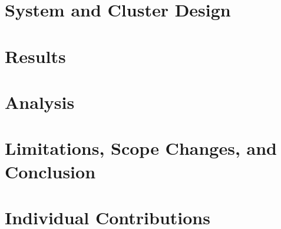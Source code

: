 \documentclass[11pt,twocolumn]{article}
\begin{document}
\section{System and Cluster Design}
\wsfourSystem
\section{Results}
\wsfourResults
\section{Analysis}
\wsfourAnalysis
\section{Limitations, Scope Changes, and Conclusion}
\wsfourConclusion
\section{Individual Contributions}
\wsfourContribution
\end{document}
